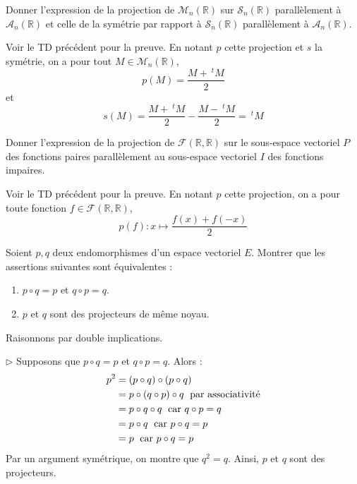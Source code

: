 \documentclass[a4paper,10pt]{report}
\begin{document}
\medskip

\begin{Exercice}{} Donner l'expression de la projection de $\mathcal{M}_n(\mathbb{R})$ sur $\mathcal{S}_n(\mathbb{R})$ parallèlement à $\mathcal{A}_n(\mathbb{R})$ et celle de la symétrie par rapport à $\mathcal{S}_n(\mathbb{R})$ parallèlement à $\mathcal{A}_n(\mathbb{R})$.
\end{Exercice}

\corr Voir le TD précédent pour la preuve. En notant $p$ cette projection et $s$ la symétrie, on a pour tout $M \in \mathcal{M}_n(\mathbb{R})$, 
$$ p(M) = \dfrac{M+ ~^t M}{2}$$
et 
$$ s(M) =  \dfrac{M+ ~^t M}{2} -  \dfrac{M- ~^t M}{2} =~^t M$$

\medskip



\begin{Exercice}{} Donner l'expression de la projection de $\mathcal{F}(\mathbb{R}, \mathbb{R})$ sur le sous-espace vectoriel $P$ des fonctions paires parallèlement au sous-espace vectoriel $I$ des fonctions impaires.
\end{Exercice}

\corr Voir le TD précédent pour la preuve. En notant $p$ cette projection, on a pour toute fonction $f \in \mathcal{F}(\mathbb{R}, \mathbb{R})$,
$$ p(f) : x  \mapsto \dfrac{f(x)+f(-x)}{2}$$

\medskip


\begin{Exercice}{} Soient $p,q$ deux endomorphismes d'un espace vectoriel $E$. Montrer que les assertions suivantes sont équivalentes :
    \begin{enumerate}
\item $p \circ q = p$ et $q \circ p = q$.
\item $p$ et $q$ sont des projecteurs de même noyau.
    \end{enumerate}
\end{Exercice}

\corr Raisonnons par double implications.

\medskip

\noindent $\rhd$ Supposons que $p \circ q = p$ et $q \circ p = q$.  Alors :
\begin{align*}
p^2 & = (p \circ q) \circ (p \circ q) \\
&=p \circ (q \circ p) \circ q \; \hbox{ par associativité} \\
& =p \circ q \circ q  \; \hbox{ car } q \circ p = q\\
&=  p \circ q \; \hbox{ car } p \circ q = p\\
& = p \; \hbox{ car }  p\circ q = p
\end{align*}
Par un argument symétrique, on montre que $q^2=q$. Ainsi, $p$ et $q$ sont des projecteurs.
\end{document}
